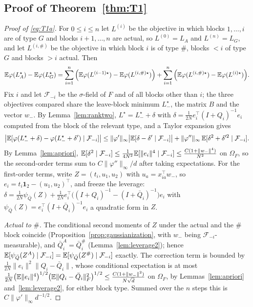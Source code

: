\subsection{Proof of Theorem~\ref{thm:T1}}

\begin{proof}[Proof of \eqref{eq:T1a}]
For $0\le i\le n$ let $L^{(i)}$ be the objective in which blocks $1,\dots,i$ are of type $G$ and blocks
$i+1,\dots,n$ are actual, so $L^{(0)}=L_A$ and $L^{(n)}=L_G$, and let $L^{(i,\#)}$ be the objective in which
block $i$ is of type $\#$, blocks $<i$ of type $G$ and blocks $>i$ actual. Then
\[
\mathbb{E}\varphi(L_A^\star)-\mathbb{E}\varphi(L_G^\star)=\sum_{i=1}^n\Big(\mathbb{E}\varphi(L^{(i-1)\star})-\mathbb{E}\varphi(L^{(i,\#)\star})\Big)
+\sum_{i=1}^n\Big(\mathbb{E}\varphi(L^{(i,\#)\star})-\mathbb{E}\varphi(L^{(i)\star})\Big).
\]
Fix $i$ and let $\mathcal F_{-i}$ be the $\sigma$-field of $F$ and of all blocks other than $i$; the three
objectives compared share the leave-block minimum $L_-^\star$, the matrix $B$ and the vector $w_-$. By
Lemma~\ref{lem:ranktwo}, $L^\star=L_-^\star+\delta$ with $\delta=\frac1{2N}e_i^\top(I+Q_i)^{-1}e_i$ computed
from the block of the relevant type, and a Taylor expansion gives
\[
\big|\mathbb{E}[\varphi(L_-^\star+\delta)-\varphi(L_-^\star+\delta')\mid\mathcal F_{-i}]\big|
\le\|\varphi'\|_\infty\big|\mathbb{E}[\delta-\delta'\mid\mathcal F_{-i}]\big|+\|\varphi''\|_\infty\,\mathbb{E}[\delta^2+\delta'^2\mid\mathcal F_{-i}].
\]
By Lemma~\ref{lem:apriori}, $\mathbb{E}[\delta^2\mid\mathcal F_{-i}]\le\frac1{4N^2}\mathbb{E}[\|e_i\|^4\mid\mathcal F_{-i}]\le\frac{C(1+\|w_-\|^4)}{N^2}$
on $\Omega_F$, so the second-order terms sum to $C\|\varphi''\|_\infty/d$ after taking expectations. For the
first-order terms, write $Z=(t_i,u_1,u_2)$ with $u_a=x_{ia}^\top w_-$, so $e_i=t_i\mathbf 1_2-(u_1,u_2)^\top$, and freeze the
leverage: $\delta=\frac1{2N}\psi_{\bar Q}(Z)+\frac1{2N}e_i^\top\big((I+Q_i)^{-1}-(I+\bar Q_i)^{-1}\big)e_i$ with
$\psi_{\bar Q}(Z)=e_i^\top(I+\bar Q_i)^{-1}e_i$ a quadratic form in $Z$.

\emph{Actual to $\#$.} The conditional second moments of $Z$ under the actual and the $\#$ block coincide
(Proposition~\ref{prop:gaussianization}, with $w_-$ being $\mathcal F_{-i}$-measurable), and $\bar Q_i^A=\bar Q_i^\#$
(Lemma~\ref{lem:leverage2}); hence $\mathbb{E}[\psi_{\bar Q}(Z^A)\mid\mathcal F_{-i}]=\mathbb{E}[\psi_{\bar Q}(Z^\#)\mid\mathcal F_{-i}]$
exactly. The correction term is bounded by $\frac1{2N}\|e_i\|^2\|Q_i-\bar Q_i\|$, whose conditional expectation
is at most $\frac1{2N}\big(\mathbb{E}\|e_i\|^4\big)^{1/2}\big(\mathbb{E}\|Q_i-\bar Q_i\|_F^2\big)^{1/2}\le\frac{C(1+\|w_-\|^2)}{N\sqrt d}$
on $\Omega_F$, by Lemmas~\ref{lem:apriori} and~\ref{lem:leverage2}, for either block type. Summed over the $n$
steps this is $C\|\varphi'\|_\infty d^{-1/2}$.


\end{proof}
